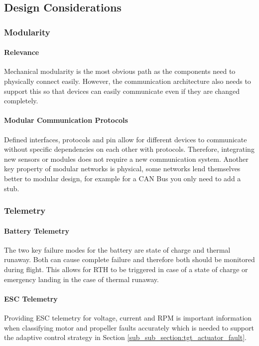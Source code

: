 \subsection{Design Considerations}\label{sub_sub_section:tgt_intra_comms_design_considerations}

\subsubsection{Modularity}\label{sub_sub_section:tgt_modularity}
\paragraph{Relevance}
Mechanical modularity is the most obvious path as the components need to physically connect easily. However, the communication architecture also needs to support this so that devices can easily communicate even if they are changed completely.
\paragraph{Modular Communication Protocols}
Defined interfaces, protocols and pin allow for different devices to communicate without specific dependencies on each other with protocols. Therefore, integrating new sensors or modules does not require a new communication system. Another key property of modular networks is physical, some networks lend themselves better to modular design, for example for a \gls{CAN} Bus you only need to add a stub.

\subsubsection{Telemetry}\label{sub_sub_section:tgt_telemetry}
\paragraph{Battery Telemetry}
The two key failure modes for the battery are state of charge and thermal runaway. Both can cause complete failure and therefore both should be monitored during flight. This allows for \gls{RTH} to be triggered in case of a state of charge or emergency landing in the case of thermal runaway.
\paragraph{\gls{ESC} Telemetry}
Providing \gls{ESC} telemetry for voltage, current and \gls{RPM} is important information when classifying motor and propeller faults accurately which is needed to support the adaptive control strategy in Section \ref{sub_sub_section:tgt_actuator_fault}.   

